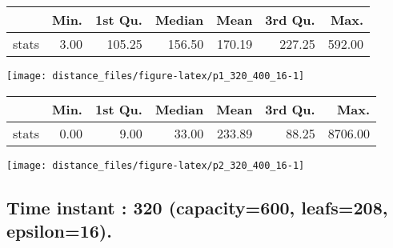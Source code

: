 \documentclass[
  9pt,
  landscape]{article}
\begin{document}
\begin{minipage}{0.5\textwidth} 
\centering 
\begin{tabular}{rrrrrrr}
  \hline
 & Min. & 1st Qu. & Median & Mean & 3rd Qu. & Max. \\ 
  \hline
stats & 3.00 & 105.25 & 156.50 & 170.19 & 227.25 & 592.00 \\ 
   \hline
\end{tabular}
\vspace{0.5cm} 


\texttt{[image: distance\_files/figure-latex/p1\_320\_400\_16-1]} 

\end{minipage} 
\begin{minipage}{0.5\textwidth} 
\centering 
\begin{tabular}{rrrrrrr}
  \hline
 & Min. & 1st Qu. & Median & Mean & 3rd Qu. & Max. \\ 
  \hline
stats & 0.00 & 9.00 & 33.00 & 233.89 & 88.25 & 8706.00 \\ 
   \hline
\end{tabular}
\vspace{0.5cm} 


\texttt{[image: distance\_files/figure-latex/p2\_320\_400\_16-1]} 

\end{minipage}

\pagebreak

\hypertarget{time-instant-320-capacity600-leafs208-epsilon16.}{%
\subsection{Time instant : 320 (capacity=600, leafs=208,
epsilon=16).}\label{time-instant-320-capacity600-leafs208-epsilon16.}}
\end{document}

